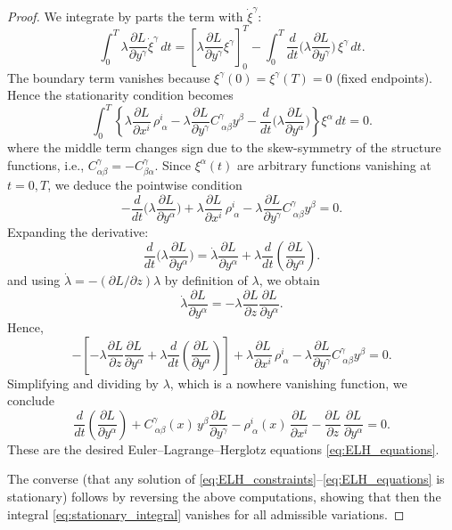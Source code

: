\documentclass[10pt,a4paper]{amsart}
\begin{document}
\begin{proof}
We integrate by parts the term with $\dot \xi^\gamma$:
\[
\int_0^T \lambda \frac{\partial L}{\partial y^\gamma} \dot \xi^\gamma\, dt
= \left[ \lambda \frac{\partial L}{\partial y^\gamma} \xi^\gamma \right]_0^T
- \int_0^T \frac{d}{dt}\Big(\lambda \frac{\partial L}{\partial y^\gamma}\Big)
\,\xi^\gamma \,dt.
\]
The boundary term vanishes because $\xi^{\gamma}(0)=\xi^{\gamma}(T)=0$ (fixed endpoints).
Hence the stationarity condition becomes
\[
\int_0^T \left\{
\lambda \frac{\partial L}{\partial x^i}\,\rho^i_{\ \alpha}
- \lambda \frac{\partial L}{\partial y^\gamma} C^\gamma_{\ \alpha\beta}y^\beta
- \frac{d}{dt}\Big(\lambda \frac{\partial L}{\partial y^\alpha}\Big)
\right\} \xi^\alpha \, dt = 0.
\]
where the middle term changes sign due to the skew-symmetry of the structure functions, i.e., $C_{\alpha \beta}^{\gamma}=-C_{\beta \alpha}^{\gamma}$. Since $\xi^\alpha(t)$ are arbitrary functions vanishing at $t=0,T$,
we deduce the pointwise condition
\[
- \frac{d}{dt}\Big(\lambda \frac{\partial L}{\partial y^\alpha}\Big)
+ \lambda \frac{\partial L}{\partial x^i}\,\rho^i_{\ \alpha}
- \lambda \frac{\partial L}{\partial y^\gamma} C^\gamma_{\ \alpha\beta}y^\beta
= 0.
\]
Expanding the derivative:
\[
\frac{d}{dt}\Big(\lambda \frac{\partial L}{\partial y^\alpha}\Big)
= \dot \lambda \frac{\partial L}{\partial y^\alpha}
+ \lambda \frac{d}{dt}\left( \frac{\partial L}{\partial y^\alpha}\right).
\]
and using $\dot\lambda = -(\partial L/\partial z)\lambda$ by definition of $\lambda$,
we obtain
\[
\dot \lambda \frac{\partial L}{\partial y^\alpha}
= -\lambda \frac{\partial L}{\partial z}\frac{\partial L}{\partial y^\alpha}.
\]
Hence,
\[
- \left[
-\lambda \frac{\partial L}{\partial z}\frac{\partial L}{\partial y^\alpha}
+ \lambda \frac{d}{dt}\left( \frac{\partial L}{\partial y^\alpha}\right)
\right]
+ \lambda \frac{\partial L}{\partial x^i}\,\rho^i_{\ \alpha}
- \lambda \frac{\partial L}{\partial y^\gamma} C^\gamma_{\ \alpha\beta}y^\beta
= 0.
\]
Simplifying and dividing by $\lambda$, which is a nowhere vanishing function, we conclude
\[
\frac{d}{dt}\left(\frac{\partial L}{\partial y^\alpha}\right)
+ C^\gamma_{\ \alpha\beta}(x)\,y^\beta \frac{\partial L}{\partial y^\gamma}
- \rho^i_{\ \alpha}(x)\,\frac{\partial L}{\partial x^i}
- \frac{\partial L}{\partial z}\,\frac{\partial L}{\partial y^\alpha}
= 0.
\]
These are the desired Euler--Lagrange--Herglotz equations \eqref{eq:ELH_equations}.

The converse (that any solution of \eqref{eq:ELH_constraints}--\eqref{eq:ELH_equations}
is stationary) follows by reversing the above computations, showing that then
the integral \eqref{eq:stationary_integral} vanishes for all admissible
variations.
\end{proof}
\end{document}
